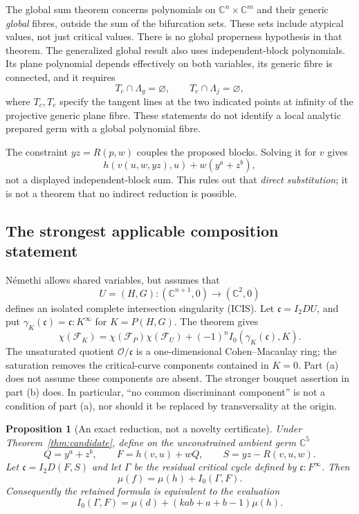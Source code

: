 \documentclass[11pt]{article}
\newtheorem{proposition}{Proposition}
\newcommand{\C}{\mathbb C}
\newcommand{\OO}{\mathcal O}
\newcommand{\crit}{\mathfrak c}
\newcommand{\MF}{\mathcal F}
\begin{document}
The global sum theorem \cite[Theorems 2.2 and 2.4]{nemethi-global}
concerns polynomials on \(\C^n\times\C^m\) and their generic
\emph{global} fibres, outside the sum of the bifurcation sets.
These sets include atypical values, not just critical values.
There is no global properness hypothesis in that theorem.
The generalized global result
\cite[Section 3.2 and Theorem G1, p.~6]{nemethi80}
also uses independent-block polynomials.  Its plane polynomial
depends effectively on both variables, its generic fibre is
connected, and it requires
\[
 T_c\cap\Lambda_g=\varnothing,\qquad
 T_e\cap\Lambda_j=\varnothing,
\]
where \(T_c,T_e\) specify the tangent lines at the two indicated
points at infinity of the projective generic plane fibre.
These statements do not identify a local analytic prepared germ
with a global polynomial fibre.

The constraint \(yz=R(p,w)\) couples the proposed blocks.  Solving
it for \(v\) gives
\[
 h(v(u,w,yz),u)+w(y^a+z^b),
\]
not a displayed independent-block sum.
This rules out that \emph{direct substitution};
it is not a theorem that no indirect reduction is possible.

\subsection{The strongest applicable composition statement}

N\'emethi \cite[Sections 2.0.1--2.0.4 and Theorem A(a),
pp.~66--69]{nemethi79} allows shared variables, but assumes that
\[
 U=(H,G):(\C^{n+1},0)\longrightarrow(\C^2,0)
\]
defines an isolated complete intersection singularity (ICIS).
Let \(\crit=I_2 DU\), and put
\(\gamma_K(\crit)=\crit:K^\infty\) for \(K=P(H,G)\).
The theorem gives
\begin{equation}\label{eq:nemethi}
 \chi(\MF_K)=\chi(\MF_P)\chi(\MF_U)
               +(-1)^n I_0(\gamma_K(\crit),K).
\end{equation}
The unsaturated quotient \(\OO/\crit\) is a
one-dimensional Cohen--Macaulay ring; the saturation removes
the critical-curve components contained in \(K=0\).
Part (a) does not assume these components are absent.
The stronger bouquet assertion in part (b) does.  In particular,
``no common discriminant component'' is not a condition of
part (a), nor should it be replaced by transversality at the origin.

\begin{proposition}[An exact reduction, not a novelty certificate]
\label{prop:reduction}
Under Theorem~\ref{thm:candidate}, define on the unconstrained
ambient germ \(\C^5\)
\[
 Q=y^a+z^b,\qquad F=h(v,u)+wQ,\qquad S=yz-R(v,u,w).
\]
Let \(\crit=I_2D(F,S)\) and let \(\Gamma\) be the residual critical
cycle defined by \(\crit:F^\infty\).  Then
\begin{equation}\label{eq:residual-F}
 \mu(f)=\mu(h)+I_0(\Gamma,F).
\end{equation}
Consequently the retained formula is equivalent to the evaluation
\begin{equation}\label{eq:delta-F}
 I_0(\Gamma,F)=\mu(d)+(kab+a+b-1)\mu(h).
\end{equation}
\end{proposition}
\end{document}
